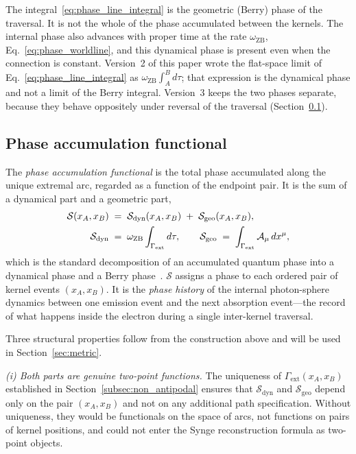 \documentclass[%
 reprint, amsmath,amssymb, aps, prb, ]{revtex4-2}
\numberwithin{equation}{section}
\newcommand{\omZB}{\omega_{\text{ZB}}}
\begin{document}
The integral~\eqref{eq:phase_line_integral} is the geometric (Berry) phase of the traversal. It is not the whole of the phase accumulated between the kernels. The internal phase also advances with proper time at the rate $\omZB$, Eq.~\eqref{eq:phase_worldline}, and this dynamical phase is present even when the connection is constant. Version~2 of this paper wrote the flat-space limit of Eq.~\eqref{eq:phase_line_integral} as $\omZB\int_A^B d\tau$; that expression is the dynamical phase and not a limit of the Berry integral. Version~3 keeps the two phases separate, because they behave oppositely under reversal of the traversal (Section~\ref{subsec:functional}).

\subsection{Phase accumulation functional}
\label{subsec:functional}

The \emph{phase accumulation functional} is the total phase accumulated along the unique extremal arc, regarded as a function of the endpoint pair. It is the sum of a dynamical part and a geometric part,
\begin{align}
\mathcal{S}(x_A, x_B) &\;=\; \mathcal{S}_{\mathrm{dyn}}(x_A, x_B) \;+\; \mathcal{S}_{\mathrm{geo}}(x_A, x_B),
\notag\\
\mathcal{S}_{\mathrm{dyn}} &\;=\; \omZB\int_{\Gamma_{\mathrm{ext}}} d\tau,
\qquad
\mathcal{S}_{\mathrm{geo}} \;=\; \int_{\Gamma_{\mathrm{ext}}}\mathcal{A}_\mu\,dx^\mu,
\label{eq:phase_functional}
\end{align}
which is the standard decomposition of an accumulated quantum phase into a dynamical phase and a Berry phase~\cite{Berry1984}. $\mathcal{S}$ assigns a phase to each ordered pair of kernel events $(x_A, x_B)$. It is the \emph{phase history} of the internal photon-sphere dynamics between one emission event and the next absorption event---the record of what happens inside the electron during a single inter-kernel traversal.

Three structural properties follow from the construction above and will be used in Section~\ref{sec:metric}.

\textit{(i) Both parts are genuine two-point functions.} The uniqueness of $\Gamma_{\mathrm{ext}}(x_A,x_B)$ established in Section~\ref{subsec:non_antipodal} ensures that $\mathcal{S}_{\mathrm{dyn}}$ and $\mathcal{S}_{\mathrm{geo}}$ depend only on the pair $(x_A,x_B)$ and not on any additional path specification. Without uniqueness, they would be functionals on the space of arcs, not functions on pairs of kernel positions, and could not enter the Synge reconstruction formula as two-point objects.
\end{document}
